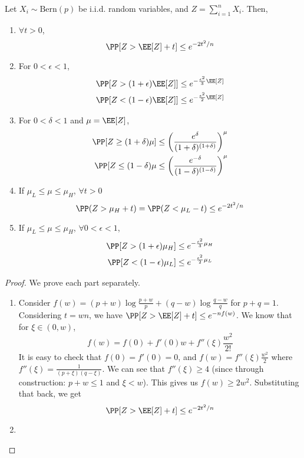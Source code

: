 \begin{theorem}
Let $X_i \sim \text{Bern}(p)$ be i.i.d. random variables, and $Z = \sum_{i=1}^n X_i$. Then,
\begin{enumerate}[label=(\roman*)]
    \item $\forall t > 0$,
    \begin{equation}\label{eq:binomial-chernoff-form1}
         \PP[Z > \EE[Z] + t] \leq e^{-2t^2/n}
    \end{equation}
    \item For $0 < \epsilon < 1$,
    \begin{align}\label{eq:binomial-chernoff-form2}
         \PP[Z > (1+\epsilon)\EE[Z]] &\leq e^{-\frac{\epsilon^2}{3} \EE[Z]} \\ 
         \PP[Z < (1-\epsilon)\EE[Z]] &\leq e^{-\frac{\epsilon^2}{2} \EE[Z]}
    \end{align}
    \item For $0 < \delta < 1$ and $\mu = \EE[Z]$,
    \begin{align}\label{eq:binomial-chernoff-form3}
         \PP[Z \geq (1+\delta)\mu] &\leq \left(\frac{e^\delta}{(1+\delta)^{(1+\delta)}}\right)^\mu \\ 
         \PP[Z \leq (1-\delta)\mu &\leq \left(\frac{e^{-\delta}}{(1-\delta)^{(1-\delta)}}\right)^\mu 
    \end{align}
    \item If $\mu_L \leq \mu \leq \mu_H$, $\forall t > 0$
    \begin{equation}\label{eq:binomial-chernoff-form4}
        \PP(Z > \mu_H + t) = \PP(Z < \mu_L - t) \leq e^{-2t^2/n}
    \end{equation}
    \item If $\mu_L \leq \mu \leq \mu_H$, $\forall 0 < \epsilon < 1$,
    \begin{align}\label{eq:binomial-chernoff-form5}
        \PP[Z > (1+\epsilon) \mu_H] &\leq e^{-\frac{\epsilon^2}{3} \mu_H} \\ 
         \PP[Z < (1-\epsilon)\mu_L] &\leq e^{-\frac{\epsilon^2}{2} \mu_L}
    \end{align}
\end{enumerate}
\end{theorem}
\begin{proof} We prove each part separately.
\begin{enumerate}[label=(\roman*)]
    \item Consider $f(w) = (p+w)\log\frac{p+w}{p} + (q-w)\log\frac{q-w}{q}$ for $p+q=1$. Considering $t = wn$, we have $\PP[Z > \EE[Z] + t] \leq e^{-n f(w)}$. We know that for $\xi \in (0,w)$, 
    \[ 
    f(w) = f(0) + f'(0)w + f''(\xi)\frac{w^2}{2!}
    \]
    It is easy to check that $f(0) = f'(0) = 0$, and $f(w) = f''(\xi) \frac{w^2}{2}$ where $f''(\xi) = \frac{1}{(p+\xi)(q-\xi)}$. We can see that $f''(\xi) \geq 4$ (since through construction: $p+w \leq 1$ and $\xi < w$). This gives us $f(w) \geq 2w^2$. Substituting that back, we get 
    \[
    \PP[Z > \EE[Z] + t] \leq e^{-2t^2/n}
    \]
    \item 
\end{enumerate}
\end{proof}
